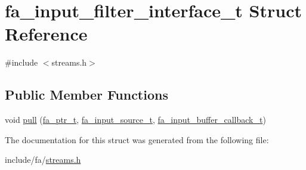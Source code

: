 \hypertarget{structfa__input__filter__interface__t}{\section{fa\-\_\-input\-\_\-filter\-\_\-interface\-\_\-t Struct Reference}
\label{structfa__input__filter__interface__t}
}


{\ttfamily \#include $<$streams.\-h$>$}

\subsection*{Public Member Functions}
\begin{DoxyCompactItemize}
\item 
void \hyperlink{group___fa_ga1706ea8236209f6e29fa65f30a6a64f6}{pull} (\hyperlink{group___fa_ga915ddeae99ad7568b273d2b876425197}{fa\-\_\-ptr\-\_\-t}, \hyperlink{group___fa_input_gad1696c209650d2d4758d2af9edefb919}{fa\-\_\-input\-\_\-source\-\_\-t}, \hyperlink{group___fa_input_gac28594faa4f5b9d2815a4dda56634282}{fa\-\_\-input\-\_\-buffer\-\_\-callback\-\_\-t})
\end{DoxyCompactItemize}


The documentation for this struct was generated from the following file\-:\begin{DoxyCompactItemize}
\item 
include/fa/\hyperlink{streams_8h}{streams.\-h}\end{DoxyCompactItemize}
